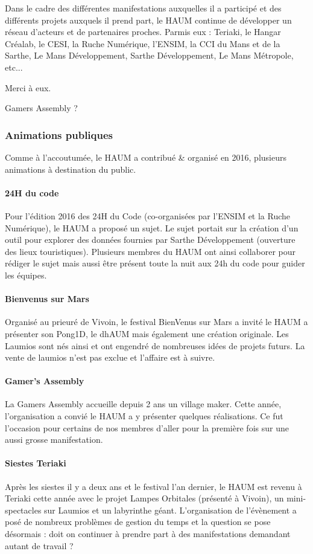 \documentclass[11pt,twosided]{article}
\begin{document}
Dans le cadre des différentes manifestations auxquelles il a participé et des différents projets auxquels il prend part, le HAUM continue de développer un réseau d'acteurs et de partenaires proches. Parmis eux : Teriaki, le Hangar Créalab, le CESI, la Ruche Numérique, l'ENSIM, la CCI du Mans et de la Sarthe, Le Mans Développement, Sarthe Développement, Le Mans Métropole, etc...

Merci à eux.

Gamers Assembly ?

\subsubsection{Animations publiques}

Comme à l'accoutumée, le HAUM a contribué \& organisé en 2016, plusieurs animations à destination du public.

\paragraph{24H du code} Pour l'édition 2016 des 24H du Code (co-organisées par l'ENSIM et la Ruche Numérique), le HAUM a proposé un sujet. Le sujet portait sur la création d'un outil pour explorer des données fournies par Sarthe Développement (ouverture des lieux touristiques). Plusieurs membres du HAUM ont ainsi collaborer pour rédiger le sujet mais aussi être présent toute la nuit aux 24h du code pour guider les équipes.

\paragraph{Bienvenus sur Mars} Organisé au prieuré de Vivoin, le festival BienVenus sur Mars a invité le HAUM a présenter son Pong1D, le dhAUM mais également une création originale. Les Laumios sont nés ainsi et ont engendré de nombreuses idées de projets futurs. La vente de laumios n'est pas exclue et l'affaire est à suivre.

\paragraph{Gamer's Assembly} La Gamers Assembly accueille depuis 2 ans un village maker. Cette année, l'organisation a convié le HAUM a y présenter quelques réalisations. Ce fut l'occasion pour certains de nos membres d'aller pour la première fois sur une aussi grosse manifestation.

\paragraph{Siestes Teriaki} Après les siestes il y a deux ans et le festival l'an dernier, le HAUM est revenu à Teriaki cette année avec le projet Lampes Orbitales (présenté à Vivoin), un mini-spectacles sur Laumios et un labyrinthe géant. L'organisation de l'évènement a posé de nombreux problèmes de gestion du temps et la question se pose désormais : doit on continuer à prendre part à des manifestations demandant autant de travail ?
\end{document}
